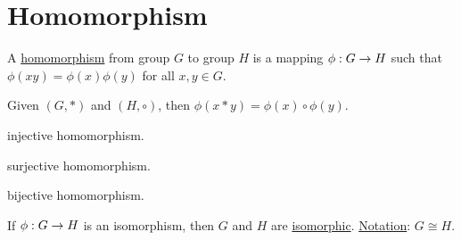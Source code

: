 \documentclass[]{article}
\begin{document}
\section{Homomorphism}

\begin{definition}
	A \ul{homomorphism} from group $G$ to group $H$ is a mapping $\phi:G\rightarrow H$ such that $\phi(xy) = \phi(x)\phi(y)$ for all $x,y\in G$.
\end{definition}
\begin{remark}
	Given $(G,*)$ and $(H,\circ)$, then $\phi(x*y) = \phi(x)\circ\phi(y)$.
\end{remark}
\begin{definition}
	[Monomorphism] injective homomorphism.
\end{definition}
\begin{definition}
	[Epimorphism] surjective homomorphism.
\end{definition}
\begin{definition}
	[Isomorphism] bijective homomorphism.
\end{definition}
If $\phi:G\rightarrow H$ is an isomorphism, then $G$ and $H$ are \ul{isomorphic}.
\ul{Notation}: $G \cong H$.
\end{document}

